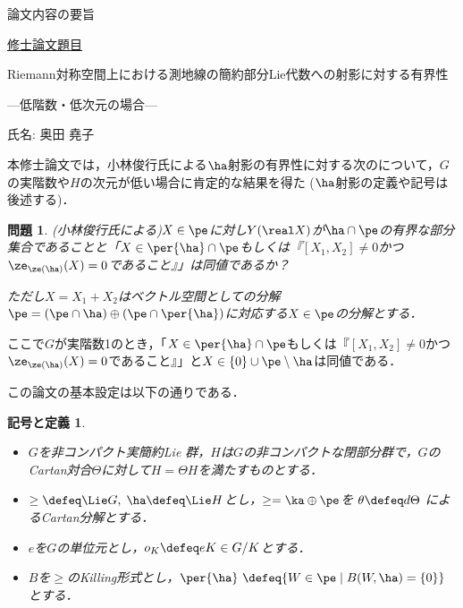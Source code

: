 \documentclass[12pt,dvipdfmx,uplatex]{jsarticle}
\newcounter{countabst}
\newtheorem{prob-a}[countabst]{問題}
\newtheorem{nttdef-a}[countabst]{記号と定義}
\begin{document}
% 
\begin{center}
  論文内容の要旨
\end{center}

\noindent\underline{修士論文題目}
\vspace{-1em}
\begin{center}
  Riemann対称空間上における測地線の簡約部分Lie代数への射影に対する有界性

  ---低階数・低次元の場合---
\end{center}
\vspace{-0.5em}

\noindent 氏名: 奥田 堯子

\vspace{0.5em}

本修士論文では，小林俊行氏による$\ha$射影の有界性に対する次のについて，$G$の実階数や$H$の次元が低い場合に肯定的な結果を得た ($\ha$射影の定義や記号は後述する)．

\begin{prob-a}(小林俊行氏による)\label{prob:1121}
  $X\in \pe$に対し$Y(\real X)$が$ \ha\cap \pe$の有界な部分集合であることと「$X\in \per{\ha}\cap\pe $もしくは『$ [X_1, X_2]\neq 0 $かつ$\ze_{\ze(\ha)}(X) = 0$であること』」は同値であるか？

  ただし$X = X_1 + X_2 $はベクトル空間としての分解$\pe =(\pe\cap \ha)\oplus(\pe\cap\per{\ha}) $に対応する$X\in \pe$の分解とする．
\end{prob-a}

ここで$G$が実階数1のとき，「$X\in \per{\ha}\cap\pe $もしくは『$ [X_1, X_2]\neq 0 $かつ$\ze_{\ze(\ha)}(X) = 0$であること』」と$X\in \{0\}\cup\pe\setminus\ha $は同値である．


この論文の基本設定は以下の通りである．
\begin{nttdef-a}
  \leavevmode\vspace{-1em}
  \begin{itemize}
  \item $G$を非コンパクト実簡約Lie 群，$H$は$G$の非コンパクトな閉部分群で，$G$のCartan対合$\Theta$に対して$H = \Theta H$を満たすものとする．
  \item $\ge \defeq \Lie G,\; \ha \defeq \Lie H$とし，$\ge = \ka\oplus \pe$を $\theta \defeq d\Theta$ によるCartan分解とする．
  \item  $e$を$G$の単位元とし，$o_K \defeq eK\in G/K$とする．
  \item $B$を$\ge$のKilling形式とし，$\per{\ha}\ \defeq \{W\in \pe\mid B(W, \ha) = \{0\}\} $とする．
  \end{itemize}  
\end{nttdef-a}
\vspace{-0.5em}
\end{document}
